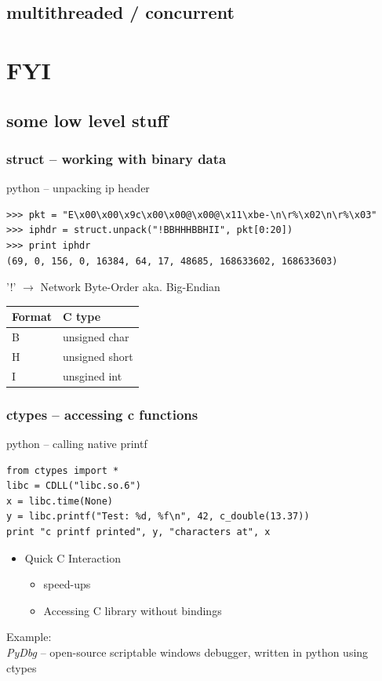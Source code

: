 \documentclass{beamer}
\begin{document}
\subsection*{multithreaded / concurrent}	%


\section{FYI}

\subsection*{some low level stuff}	%

\begin{frame}[fragile]
	\frametitle{struct -- working with binary data}
	\begin{exampleblock}{python -- unpacking ip header}
	\begin{lstlisting}
>>> pkt = "E\x00\x00\x9c\x00\x00@\x00@\x11\xbe-\n\r%\x02\n\r%\x03"
>>> iphdr = struct.unpack("!BBHHHBBHII", pkt[0:20])
>>> print iphdr
(69, 0, 156, 0, 16384, 64, 17, 48685, 168633602, 168633603)
	\end{lstlisting}
	\end{exampleblock}
	'!' $\rightarrow$ Network Byte-Order aka. Big-Endian\\[0.4cm]
	\begin{tabular}{|l|l|}	
	Format & C type\\
	\hline
	B & unsigned char\\
	H & unsigned short\\
	I & unsgined int\\	
	\end{tabular}
\end{frame}

\begin{frame}[fragile]
	\frametitle{ctypes -- accessing c functions}
	\begin{exampleblock}{python -- calling native printf}
	\begin{lstlisting}
from ctypes import *
libc = CDLL("libc.so.6")
x = libc.time(None)
y = libc.printf("Test: %d, %f\n", 42, c_double(13.37))
print "c printf printed", y, "characters at", x
	\end{lstlisting}
	\end{exampleblock}
\pause
	\begin{itemize}
		\item Quick C Interaction
		\begin{itemize}
			\item speed-ups
			\item Accessing C library without bindings
		\end{itemize}
	\end{itemize}
	Example:\\
	\emph{PyDbg} -- open-source scriptable windows debugger, written in python using ctypes
\end{frame}
\end{document}

